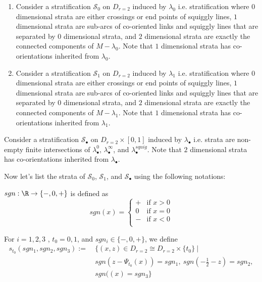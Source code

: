 \begin{definition}
\begin{enumerate}
\item Consider a stratification $\mathcal{S}_0$ on $D_{r=2}$ induced by $\lambda_0$ i.e. stratification where $0$ dimensional strata are either crossings or end points of squiggly lines, $1$ dimensional strata are sub-arcs of co-oriented links and squiggly lines that are separated by $0$ dimensional strata, and $2$ dimensional strata are exactly the connected components of $M-\lambda_0$. Note that $1$ dimensional strata has co-orientations inherited from $\lambda_0$.

\item Consider a stratification $\mathcal{S}_1$ on $D_{r=2}$ induced by $\lambda_1$ i.e. stratification where $0$ dimensional strata are either crossings or end points of squiggly lines, $1$ dimensional strata are sub-arcs of co-oriented links and squiggly lines that are separated by $0$ dimensional strata, and $2$ dimensional strata are exactly the connected components of $M-\lambda_1$. Note that $1$ dimensional strata has co-orientations inherited from $\lambda_1$.
\end{enumerate}

\item Consider a stratification $\mathcal{S}_\bullet$ on $D_{r=2}\times [0,1]$ induced by $\lambda_\bullet$ i.e. strata are non-empty finite intersections of $\lambda_\bullet^0$, $\lambda_\bullet^\infty$, and $\lambda_\bullet^{squig}$. Note that $2$ dimensional strata has co-orientations inherited from $\lambda_\bullet$.
\end{definition}

Now let's list the strata of $\mathcal{S}_0$, $\mathcal{S}_1$, and $\mathcal{S}_\bullet$ using the following notations:
\begin{definition}
$sgn : \R \rightarrow \{-,0,+ \}$ is defined as 
\[sgn(x)=\left\{
\begin{array}{ll}
    + & \text{if } x > 0 \\
    0 & \text{if } x = 0 \\
	- & \text{if } x < 0 \\
\end{array}
\right.
\]
\end{definition}

\begin{definition}
For $i = 1,2,3$ , $t_0 = 0,1$, and $sgn_i \in \{-,0,+\}$, we define
\begin{align*}
s_{t_0}(sgn_1,sgn_2,sgn_3):=~ &\{(x,z) \in D_{r=2}\cong D_{r=2}\times \{t_0\} ~| \\
&sgn(z-\Psi_{t_0}(x))=sgn_1,~ sgn(-\frac{1}{2}-z)=sgn_2,\\ 
&sgn((x)=sgn_3\}
\end{align*}
\end{definition}

